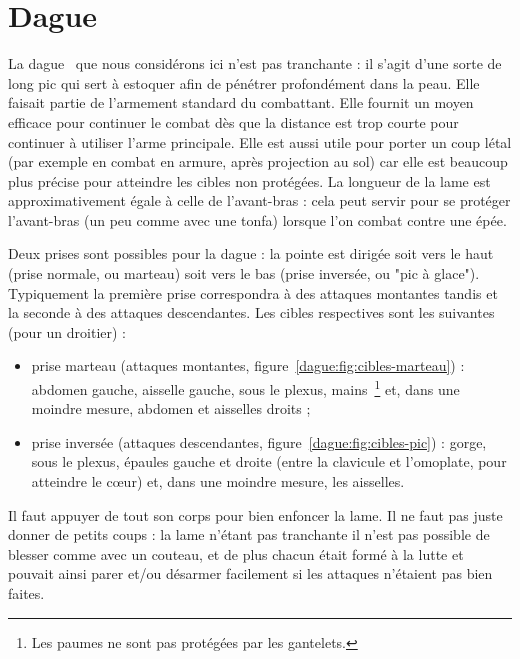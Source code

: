 \chapter{Dague}


La dague~\footnotemark{} que nous considérons ici n'est pas tranchante : il s'agit d'une sorte de long pic qui sert à estoquer afin de pénétrer profondément dans la peau.%
Elle faisait partie de l'armement standard du combattant.
Elle fournit un moyen efficace pour continuer le combat dès que la distance est trop courte pour continuer à utiliser l'arme principale.
Elle est aussi utile pour porter un coup létal (par exemple en combat en armure, après projection au sol) car elle est beaucoup plus précise pour atteindre les cibles non protégées.
La longueur de la lame est approximativement égale à celle de l'avant-bras : cela peut servir pour se protéger l'avant-bras (un peu comme avec une tonfa) lorsque l'on combat contre une épée.

Deux prises sont possibles pour la dague : la pointe est dirigée soit vers le haut (prise normale, ou marteau) soit vers le bas (prise inversée, ou "pic à glace").
Typiquement la première prise correspondra à des attaques montantes tandis et la seconde à des attaques descendantes.
Les cibles respectives sont les suivantes (pour un droitier) :
\begin{itemize}
	\item prise marteau (attaques montantes, figure~\ref{dague:fig:cibles-marteau}) : abdomen gauche, aisselle gauche, sous le plexus, mains~\footnote{Les paumes ne sont pas protégées par les gantelets.} et, dans une moindre mesure, abdomen et aisselles droits ;
	\item prise inversée (attaques descendantes, figure~\ref{dague:fig:cibles-pic}) : gorge, sous le plexus, épaules gauche et droite (entre la clavicule et l'omoplate, pour atteindre le cœur) et, dans une moindre mesure, les aisselles.
\end{itemize}
Il faut appuyer de tout son corps pour bien enfoncer la lame.
Il ne faut pas juste donner de petits coups : la lame n'étant pas tranchante il n'est pas possible de blesser comme avec un couteau, et de plus chacun était formé à la lutte et pouvait ainsi parer et/ou désarmer facilement si les attaques n'étaient pas bien faites.


